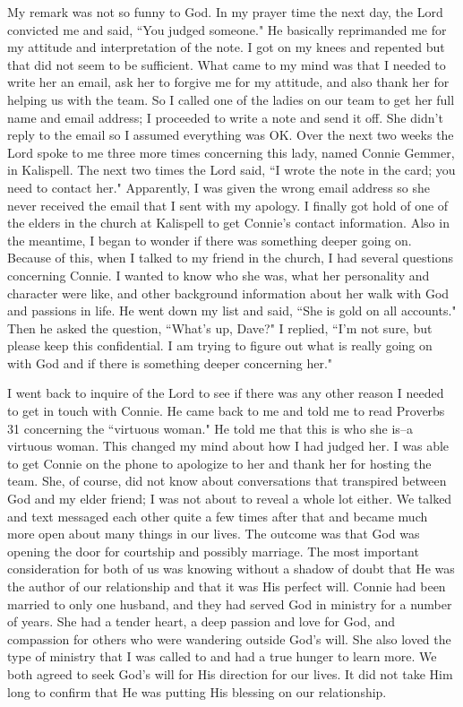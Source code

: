 \documentclass[oneside]{book}
\begin{document}
My remark was not so funny to God. In my prayer time the next day, the Lord convicted me and said, ``You judged someone." He basically reprimanded me for my attitude and interpretation of the note. I got on my knees and repented but that did not seem to be sufficient. What came to my mind was that I needed to write her an email, ask her to forgive me for my attitude, and also thank her for helping us with the team. So I called one of the ladies on our team to get her full name and email address; I proceeded to write a note and send it off. She didn't reply to the email so I assumed everything was OK. Over the next two weeks the Lord spoke to me three more times concerning this lady, named Connie Gemmer, in Kalispell. The next two times the Lord said, ``I wrote the note in the card; you need to contact her." Apparently, I was given the wrong email address so she never received the email that I sent with my apology. I finally got hold of one of the elders in the church at Kalispell to get Connie's contact information. Also in the meantime, I began to wonder if there was something deeper going on. Because of this, when I talked to my friend in the church, I had several questions concerning Connie. I wanted to know who she was, what her personality and character were like, and other background information about her walk with God and passions in life. He went down my list and said, ``She is gold on all accounts." Then he asked the question, ``What's up, Dave?" I replied, ``I'm not sure, but please keep this confidential. I am trying to figure out what is really going on with God and if there is something deeper concerning her." 

I went back to inquire of the Lord to see if there was any other reason I needed to get in touch with Connie. He came back to me and told me to read Proverbs 31 concerning the ``virtuous woman." He told me that this is who she is--a virtuous woman. This changed my mind about how I had judged her. I was able to get Connie on the phone to apologize to her and thank her for hosting the team. She, of course, did not know about  conversations that transpired between God and my elder friend; I was not about to reveal a whole lot either. We talked and text messaged each other quite a few times after that and became much more open about many things in our lives. The outcome was that God was opening the door for courtship and possibly marriage. The most important consideration for both of us was knowing without a shadow of doubt that He was the author of our relationship and that it was His perfect will. Connie had been married to only one husband, and they had served God in ministry for a number of years. She had a tender heart, a deep passion and love for God, and compassion for others who were wandering outside God's will. She also loved the type of ministry that I was called to and had a true hunger to learn more. We both agreed to seek God's will for His direction for our lives. It did not take Him long to confirm that He was putting His blessing on our relationship. 
\end{document}
